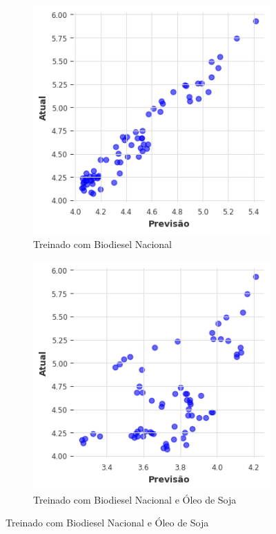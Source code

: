\begin{figure}[htbp]
	\centering
	\begin{subfigure}[b]{0.40\textwidth}
		\centering
		\includegraphics[width=\textwidth]{figuras/idln_brasil_scatter.png} %
		\caption{Treinado com Biodiesel Nacional \newline}
		\label{fig:idln_brasil_scatter}
	\end{subfigure}
	\hfill
	\begin{subfigure}[b]{0.40\textwidth}
		\centering
		\includegraphics[width=\textwidth]{figuras/idln_brasil_oil_scatter.png} %
		\caption{Treinado com Biodiesel Nacional e Óleo de Soja}
		\label{fig:idln_brasil_oil_scatter}
	\end{subfigure}


\end{figure}
